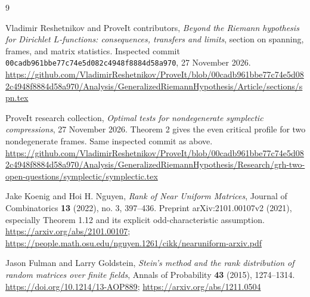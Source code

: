 \documentclass[11pt,letterpaper]{article}
\begin{document}
\begin{thebibliography}{9}
\raggedright
{}
Vladimir Reshetnikov and ProveIt contributors,
\emph{Beyond the Riemann hypothesis for Dirichlet $L$-functions:
consequences, transfers and limits}, section on spanning, frames, and
matrix statistics. Inspected commit
\texttt{00cadb961bbe77c74e5d082c4948f8884d58a970}, 27 November 2026.\newline
\url{https://github.com/VladimirReshetnikov/ProveIt/blob/00cadb961bbe77c74e5d082c4948f8884d58a970/Analysis/GeneralizedRiemannHypothesis/Article/sections/spn.tex}

ProveIt research collection,
\emph{Optimal tests for nondegenerate symplectic compressions},
27 November 2026. Theorem 2 gives the even critical profile for two
nondegenerate frames. Same inspected commit as above.\newline
\url{https://github.com/VladimirReshetnikov/ProveIt/blob/00cadb961bbe77c74e5d082c4948f8884d58a970/Analysis/GeneralizedRiemannHypothesis/Research/grh-two-open-questions/symplectic/symplectic.tex}

Jake Koenig and Hoi H. Nguyen,
\emph{Rank of Near Uniform Matrices},
Journal of Combinatorics \textbf{13} (2022), no. 3, 397--436.
Preprint arXiv:2101.00107v2 (2021), especially Theorem 1.12 and its
explicit odd-characteristic assumption.\newline
\url{https://arxiv.org/abs/2101.00107};
\url{https://people.math.osu.edu/nguyen.1261/cikk/nearuniform-arxiv.pdf}

Jason Fulman and Larry Goldstein,
\emph{Stein's method and the rank distribution of random matrices over
finite fields}, Annals of Probability \textbf{43} (2015), 1274--1314.\newline
\url{https://doi.org/10.1214/13-AOP889};
\url{https://arxiv.org/abs/1211.0504}
\end{thebibliography}
\end{document}
